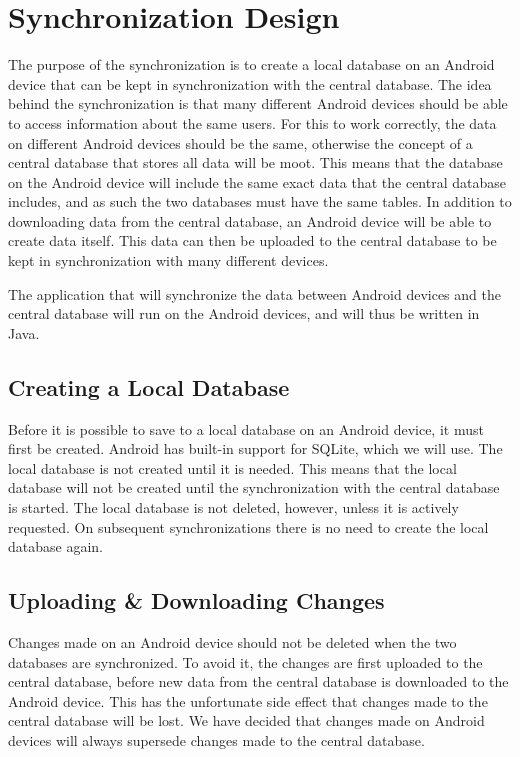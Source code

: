 \section{Synchronization Design}
The purpose of the synchronization is to create a local database on an Android device that can be kept in synchronization with the central database. The idea behind the synchronization is that many different Android devices should be able to access information about the same users. For this to work correctly, the data on different Android devices should be the same, otherwise the concept of a central database that stores all data will be moot. This means that the database on the Android device will include the same exact data that the central database includes, and as such the two databases must have the same tables. In addition to downloading data from the central database, an Android device will be able to create data itself. This data can then be uploaded to the central database to be kept in synchronization with many different devices.

The application that will synchronize the data between Android devices and the central database will run on the Android devices, and will thus be written in Java.

\subsection{Creating a Local Database}
Before it is possible to save to a local database on an Android device, it must first be created. Android has built-in support for SQLite, which we will use.
The local database is not created until it is needed. This means that the local database will not be created until the synchronization with the central database is started. The local database is not deleted, however, unless it is actively requested. On subsequent synchronizations there is no need to create the local database again.

\subsection{Uploading \& Downloading Changes}
Changes made on an Android device should not be deleted when the two databases are synchronized. To avoid it, the changes are first uploaded to the central database, before new data from the central database is downloaded to the Android device. This has the unfortunate side effect that changes made to the central database will be lost. We have decided that changes made on Android devices will always supersede changes made to the central database.

